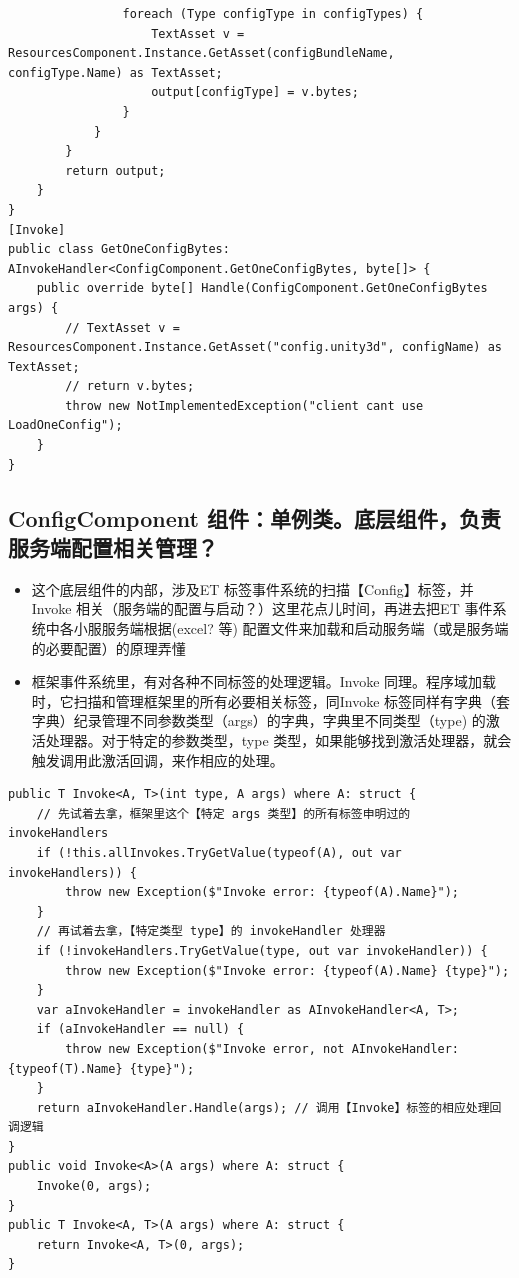 \documentclass[9pt, b5paper]{article}
\begin{document}
\begin{verbatim}
                foreach (Type configType in configTypes) {
                    TextAsset v = ResourcesComponent.Instance.GetAsset(configBundleName, configType.Name) as TextAsset;
                    output[configType] = v.bytes;
                }
            }
        }
        return output;
    }
}
[Invoke]
public class GetOneConfigBytes: AInvokeHandler<ConfigComponent.GetOneConfigBytes, byte[]> {
    public override byte[] Handle(ConfigComponent.GetOneConfigBytes args) {
        // TextAsset v = ResourcesComponent.Instance.GetAsset("config.unity3d", configName) as TextAsset;
        // return v.bytes;
        throw new NotImplementedException("client cant use LoadOneConfig");
    }
}
\end{verbatim}
\subsection{ConfigComponent 组件：单例类。底层组件，负责服务端配置相关管理？}
\label{sec-1-7}
\begin{itemize}
\item 这个底层组件的内部，涉及ET 标签事件系统的扫描【Config】标签，并Invoke 相关（服务端的配置与启动？）这里花点儿时间，再进去把ET 事件系统中各小服服务端根据(excel? 等) 配置文件来加载和启动服务端（或是服务端的必要配置）的原理弄懂
\item 框架事件系统里，有对各种不同标签的处理逻辑。Invoke 同理。程序域加载时，它扫描和管理框架里的所有必要相关标签，同Invoke 标签同样有字典（套字典）纪录管理不同参数类型（args）的字典，字典里不同类型（type) 的激活处理器。对于特定的参数类型，type 类型，如果能够找到激活处理器，就会触发调用此激活回调，来作相应的处理。
\end{itemize}
\begin{verbatim}
public T Invoke<A, T>(int type, A args) where A: struct {
    // 先试着去拿，框架里这个【特定 args 类型】的所有标签申明过的 invokeHandlers
    if (!this.allInvokes.TryGetValue(typeof(A), out var invokeHandlers)) {
        throw new Exception($"Invoke error: {typeof(A).Name}");
    }
    // 再试着去拿，【特定类型 type】的 invokeHandler 处理器
    if (!invokeHandlers.TryGetValue(type, out var invokeHandler)) {
        throw new Exception($"Invoke error: {typeof(A).Name} {type}");
    }
    var aInvokeHandler = invokeHandler as AInvokeHandler<A, T>;
    if (aInvokeHandler == null) {
        throw new Exception($"Invoke error, not AInvokeHandler: {typeof(T).Name} {type}");
    }
    return aInvokeHandler.Handle(args); // 调用【Invoke】标签的相应处理回调逻辑
}
public void Invoke<A>(A args) where A: struct {
    Invoke(0, args);
}
public T Invoke<A, T>(A args) where A: struct {
    return Invoke<A, T>(0, args);
}
\end{verbatim}
\end{document}
